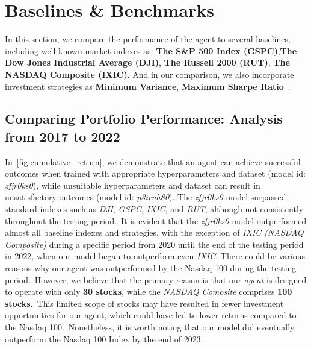 \documentclass[../xlapes02]{subfiles}
\begin{document}
    \section{Baselines \& Benchmarks}\label{sec:baselines-and-backtesting}
    In this section, we compare the performance of the agent to several baselines, including well-known market indexes as: \textbf{The S\&P 500 Index (GSPC)},\textbf{The Dow Jones Industrial Average (DJI)}, \textbf{The Russell 2000 (RUT)}, \textbf{The NASDAQ Composite (IXIC)}. And in our comparison, we also incorporate investment strategies as \textbf{Minimum Variance}, \textbf{Maximum Sharpe Ratio}~\cite{investopedia}.

    \subsection{Comparing Portfolio Performance: Analysis from 2017 to 2022}\label{subsec:cumulative-returns}
    In~\cref{fig:cumulative_return}, we demonstrate that an agent can achieve successful outcomes when trained with appropriate hyperparameters and dataset (model id: \emph{zfjr0ks0}), while unsuitable hyperparameters and dataset can result in unsatisfactory outcomes (model id: \emph{p3irnh80}). The \emph{zfjr0ks0} model surpassed standard indexes such as \emph{DJI}, \emph{GSPC}, \emph{IXIC}, and \emph{RUT}, although not consistently throughout the testing period.\ It is evident that the \emph{zfjr0ks0} model outperformed almost all baseline indexes and strategies, with the exception of \emph{IXIC (NASDAQ Composite)} during a specific period from 2020 until the end of the testing period in 2022, when our model began to outperform even \emph{IXIC}. There could be various reasons why our agent was outperformed by the Nasdaq 100 during the testing period.\ However, we believe that the primary reason is that our \emph{agent} is designed to operate with only \textbf{30 stocks}, while the \emph{NASDAQ Comosite} comprises \textbf{100 stocks}.\ This limited scope of stocks may have resulted in fewer investment opportunities for our agent, which could have led to lower returns compared to the Nasdaq 100.\ Nonetheless, it is worth noting that our model did eventually outperform the Nasdaq 100 Index by the end of 2023.
\end{document}
